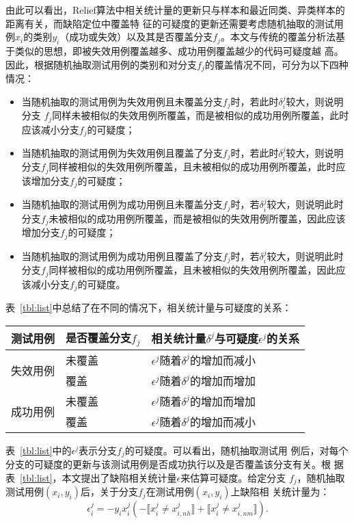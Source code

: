 由此可以看出，Relief算法中相关统计量的更新只与样本和最近同类、异类样本的距离有关，而缺陷定位中覆盖特
征的可疑度的更新还需要考虑随机抽取的测试用例$x_i$的类别$y_i$（成功或失效）以及其是否覆盖分支$f_j$。本文与传统的覆盖分析法基于类似的思想，即被失效用例覆盖越多、成功用例覆盖越少的代码可疑度越
高。因此，根据随机抽取测试用例的类别和对分支$f_j$的覆盖情况不同，可分为以下四种情况：
\begin{itemize}
      \item 当随机抽取的测试用例为失效用例且未覆盖分支$f_j$时，若此时$\delta_i^j$较大，则说明分支
      $f_j$同样未被相似的失效用例所覆盖，而是被相似的成功用例所覆盖，此时应该减小分支$f_j$的可疑度；
      \item 当随机抽取的测试用例为失效用例且覆盖了分支$f_j$时，若此时$\delta_i^j$较大，则说明分支$f_j$同样被相似的失效用例所覆盖，且未被相似的成功用例所覆盖，此时应该增加分支$f_j$的可疑度；
      \item 当随机抽取的测试用例为成功用例且未覆盖分支$f_j$时，若$\delta_i^j$较大，则说明此时分支$f_j$未被相似的成功用例所覆盖，而是被相似的失效用例所覆盖，因此应该增加分支$f_j$的可疑度；
      \item 当随机抽取的测试用例为成功用例且覆盖了分支$f_j$时，若$\delta_i^j$较大，则说明此时分支$f_j$同样被相似的成功用例所覆盖，且未被相似的失效用例所覆盖，因此应该减小分支$f_j$的可疑度。
\end{itemize}

表~\ref{tbl:list}中总结了在不同的情况下，相关统计量与可疑度的关系：
\begin{center}
\label{tbl:list}
\begin{tabular}{|l|l|l|}
\hline
测试用例 & 是否覆盖分支$f_j$ & 相关统计量$\delta^j$与可疑度$\epsilon^j$的关系\\ \hline
\multirow{2}{*}{失效用例} & 未覆盖 & $\epsilon^j$随着$\delta^j$的增加而减小\\
& 覆盖 & $\epsilon^j$随着$\delta^j$的增加而增加\\ \hline
\multirow{2}{*}{成功用例} & 未覆盖 & $\epsilon^j$随着$\delta^j$的增加而增加\\
& 覆盖 & $\epsilon^j$随着$\delta^j$的增加而减小\\ \hline
\end{tabular}
\end{center}

表~\ref{tbl:list}中的$\epsilon^j$表示分支$f_j$的可疑度。可以看出，随机抽取测试用
例后，对每个分支的可疑度的更新与该测试用例是否成功执行以及是否覆盖该分支有关。根
据表~\ref{tbl:list}，本文提出了缺陷相关统计量$\epsilon$来估算可疑度。给定分支
$f_j$，随机抽取测试用例$(x_i,y_i)$后，关于分支$f_j$在测试用例$(x_i,y_i)$上缺陷相
关统计量为：
\begin{equation}
       \epsilon_i^j = -y_ix_i^j(-\llbracket x_i^j \neq x_{i,nh}^j \rrbracket + \llbracket x_i^j \neq x_{i,nm}^j \rrbracket). \label{eq:epsilon}
\end{equation}

